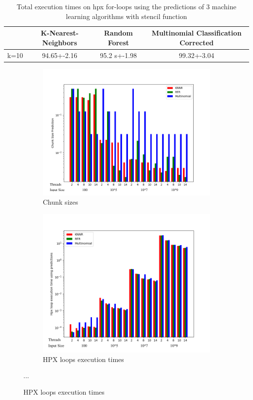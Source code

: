 \documentclass[12pt]{article}
\begin{document}
\begin{table}[h]
	\centering
	\caption{Total execution times on hpx for-loops using the predictions of 3 machine learning algorithms with stencil function}
	\label{my-label}
	\begin{tabular}{|c|c|c|c|}
		\hline
		& K-Nearest-Neighbors & Random Forest &Multinomial Classification Corrected\\ \hline
		k=10 & 94.65+-2.16  & 95.2 s+-1.98 & 99.32+-3.04\\ \hline
	\end{tabular}
\end{table}
\begin{figure}[h]
	\centering
	\begin{subfigure}[b]{0.5\textwidth}
		\centering
		\includegraphics[width=\textwidth]{stencil_predictions_bars.png}
		\caption[Network2]%
		{{Chunk sizes}}    
	\end{subfigure}
	\hfill
	\begin{subfigure}[b]{0.49\textwidth}  
		\centering 
		\includegraphics[width=\textwidth]{stencil_times_bars.png}
		\caption[]%
		{{HPX loops execution times}}    
	\end{subfigure}
	{...} 
	
\end{figure}
\end{document}
